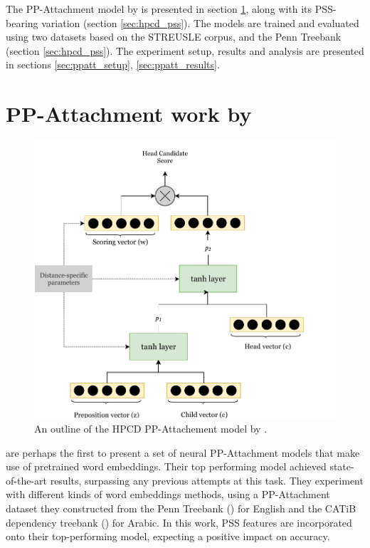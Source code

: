 The PP-Attachment model by \cite{hpcd} is presented in section \ref{sec:ppatt-belinkov}, along with its PSS-bearing variation (section \ref{sec:hpcd_pss}). The models are trained and evaluated using two datasets based on the STREUSLE corpus, and the Penn Treebank (section \ref{sec:hpcd_pss}). The experiment setup, results and analysis are presented in sections \ref{sec:ppatt_setup}, \ref{sec:ppatt_results}.

\section{PP-Attachment work by \cite{hpcd}} \label{sec:ppatt-belinkov}

\begin{figure}[h]
    \centering\small
    \includegraphics[width=\textwidth]{Figures/hpcd.pdf}
    \caption{An outline of the HPCD PP-Attachement model by \cite{hpcd}.}
    \label{fig:hpcd}
\end{figure}

\cite{hpcd} are perhaps the first to present a set of neural PP-Attachment models that make use of pretrained word embeddings. Their top performing model achieved state-of-the-art results, surpassing any previous attempts at this task. They experiment with different kinds of word embeddings methods, using a PP-Attachment dataset they constructed from the Penn Treebank  (\cite{ptb}) for English and the CATiB dependency treebank (\cite{habash09mada}) for Arabic. In this work, PSS features are incorporated onto their top-performing model, expecting a positive impact on accuracy. 

